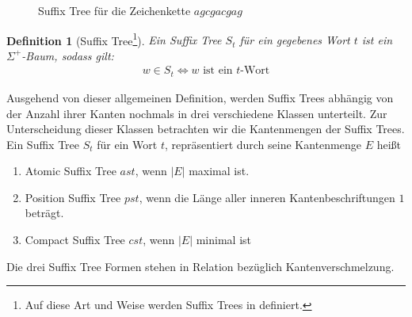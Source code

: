 \documentclass[12pt]{report}
\newtheorem{definition}{Definition}
\newcommand{\abs}[1]{\left|#1\right|}
\begin{document}
\begin{figure}[htb]
\centering
{}
\caption{Suffix Tree für die Zeichenkette $agcgacgag$}
\label{fig:suffixTreeAgcgacgag}
\end{figure}

\begin{definition}[Suffix Tree\footnote{Auf diese Art und Weise werden Suffix Trees in \cite{Giegerich1995} definiert.}]
Ein Suffix Tree $S_t$ für ein gegebenes Wort $t$ ist ein $\Sigma^+$-Baum, sodass gilt:
\begin{gather*}
    w \in S_t \Longleftrightarrow w \text{ ist ein }t\text{-Wort}
\end{gather*}
\label{def:SuffixTree}
\end{definition}

Ausgehend von dieser allgemeinen Definition, werden Suffix Trees abhängig von der Anzahl ihrer Kanten nochmals in drei verschiedene Klassen unterteilt. Zur Unterscheidung dieser Klassen betrachten wir die Kantenmengen der Suffix Trees. Ein Suffix Tree $S_t$ für ein Wort $t$, repräsentiert durch seine Kantenmenge $E$ heißt
\begin{enumerate}
    \item Atomic Suffix Tree $ast$, wenn $\abs{E}$ maximal ist.
    \item Position Suffix Tree $pst$, wenn die Länge aller inneren Kantenbeschriftungen $1$ beträgt.
    \item Compact Suffix Tree $cst$, wenn $\abs{E}$ minimal ist
\end{enumerate}
Die drei Suffix Tree Formen stehen in Relation bezüglich Kantenverschmelzung.
\end{document}
